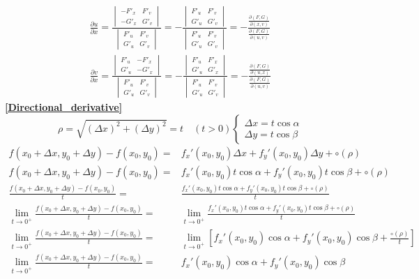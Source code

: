 \begin{align*}
	\frac{\partial u}{\partial x}=\frac{\begin{vmatrix}
			-F'_x & F'_v\\
			-G'_x & G'_v
	\end{vmatrix}}{\begin{vmatrix}
			F'_u & F'_v\\
			G'_u & G'_v
	\end{vmatrix}}=-\frac{\begin{vmatrix}
			F'_u & F'_v\\
			G'_u & G'_v
	\end{vmatrix}}{\begin{vmatrix}
			F'_u & F'_v\\
			G'_u & G'_v
	\end{vmatrix}}=-\frac{\frac{\partial(F,G)}{\partial(x,v)}}{\frac{\partial(F,G)}{\partial(u,v)}}\\
	\frac{\partial v}{\partial x}=\frac{\begin{vmatrix}
			F'_u & -F'_x\\
			G'_u & -G'_x
	\end{vmatrix}}{\begin{vmatrix}
			F'_u & F'_v\\
			G'_u & G'_v
	\end{vmatrix}}=-\frac{\begin{vmatrix}
			F'_u & F'_x\\
			G'_u & G'_x
	\end{vmatrix}}{\begin{vmatrix}
			F'_u & F'_v\\
			G'_u & G'_v
	\end{vmatrix}}=-\frac{\frac{\partial(F,G)}{\partial(u,x)}}{\frac{\partial(F,G)}{\partial(u,v)}}
\end{align*}
\textbf{\large \ref{Directional_derivative}}
	$$\rho=\sqrt{(\Delta x)^2+(\Delta y)^2}=t\quad(t>0)\begin{cases}
	\Delta x=t\cos\alpha\\
	\Delta y=t\cos\beta
\end{cases}$$
\begin{align*}
	f(x_0+\Delta x,y_0+\Delta y)-f(x_0,y_0)=&f_x'(x_0,y_0)\Delta x+f_y'(x_0,y_0)\Delta y+\circ(\rho)\\
	f(x_0+\Delta x,y_0+\Delta y)-f(x_0,y_0)=&f_x'(x_0,y_0)t\cos\alpha+f_y'(x_0,y_0)t\cos\beta+\circ(\rho)\\
	\frac{f(x_0+\Delta x,y_0+\Delta y)-f(x_0,y_0)}{t}=&\frac{f_x'(x_0,y_0)t\cos\alpha+f_y'(x_0,y_0)t\cos\beta+\circ(\rho)}{t}\\
	\lim\limits_{t\to 0^+}\frac{f(x_0+\Delta x,y_0+\Delta y)-f(x_0,y_0)}{t}=&\lim\limits_{t\to 0^+}\frac{f_x'(x_0,y_0)t\cos\alpha+f_y'(x_0,y_0)t\cos\beta+\circ(\rho)}{t}\\
	\lim\limits_{t\to 0^+}\frac{f(x_0+\Delta x,y_0+\Delta y)-f(x_0,y_0)}{t}=&\lim\limits_{t\to 0^+}\left[f_x'(x_0,y_0)\cos\alpha+f_y'(x_0,y_0)\cos\beta+\frac{\circ(\rho)}{t}\right]\\
	\lim\limits_{t\to 0^+}\frac{f(x_0+\Delta x,y_0+\Delta y)-f(x_0,y_0)}{t}=&f_x'(x_0,y_0)\cos\alpha+f_y'(x_0,y_0)\cos\beta
\end{align*}

